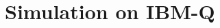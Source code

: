 \documentclass{beamer}
\theoremstyle{definition}
\newcommand{\A}{\mathcal{A}}
\newcommand{\B}{\mathcal{B}}
\begin{document}
\section{Simulation on IBM-Q}


























%
%
%
%
%
%
%
%
%
%
%
%
%
%
%
%
%
%
%
%
%
%
%
%
%
%
%
%
%
%
%
%
%
%
%
\end{document}

